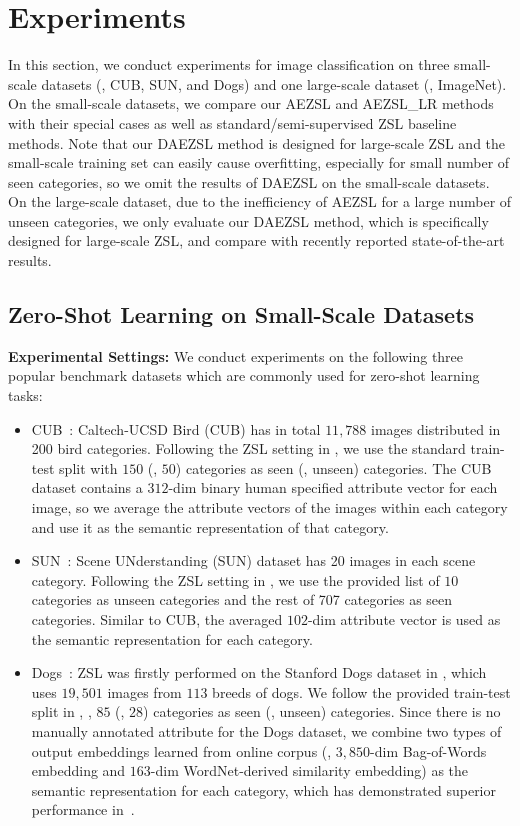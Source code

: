 \documentclass[journal]{IEEEtran}
\begin{document}
\section{Experiments} \label{sec:exp}
In this section, we conduct experiments for image classification on three small-scale datasets (\eg, CUB, SUN, and Dogs) and one large-scale dataset (\eg, ImageNet). On the small-scale datasets, we compare our AEZSL and AEZSL\_LR methods with their special cases as well as standard/semi-supervised ZSL baseline methods. Note that our DAEZSL method is designed for large-scale ZSL and the small-scale training set can easily cause overfitting, especially for small number of seen categories, so we omit the results of DAEZSL on the small-scale datasets.
On the large-scale dataset, due to the inefficiency of AEZSL for a large number of unseen categories, we only evaluate our DAEZSL method, which is specifically designed for large-scale ZSL, and compare with recently reported state-of-the-art results.

\subsection{Zero-Shot Learning on Small-Scale Datasets} \label{sec:exp_standard}

\noindent\textbf{Experimental Settings:} We conduct experiments on the following three popular benchmark datasets which are commonly used for zero-shot learning tasks:
\begin{itemize}
\item CUB~\cite{WahCUB_200_2011}: Caltech-UCSD Bird (CUB) has in total $11,788$ images distributed in 200 bird categories. Following the ZSL setting in \cite{akata2013label}, we use the standard train-test split with $150$ (\resp, $50$) categories as seen (\resp, unseen) categories. The CUB dataset contains a $312$-dim binary human specified attribute vector for each image, so we average the attribute vectors of the images within each category and use it as the semantic representation of that category.
\item SUN~\cite{xiao2010sun}: Scene UNderstanding (SUN) dataset has 20 images in each scene category. Following the ZSL setting in \cite{jayaraman2014zero}, we use the provided list of $10$ categories as unseen categories and the rest of 707 categories as seen categories. Similar to CUB, the averaged $102$-dim attribute vector is used as the semantic representation for each category.
\item Dogs~\cite{KhoslaYaoJayadevaprakashFeiFei_FGVC2011}: ZSL was firstly performed on the Stanford Dogs dataset in \cite{akata2015evaluation}, which uses $19,501$ images from $113$ breeds of dogs. We follow the provided train-test split in \cite{akata2015evaluation}, \ie, $85$ (\resp, $28$) categories as seen (\resp, unseen) categories. Since there is no manually annotated attribute for the Dogs dataset, we combine two types of output embeddings learned from online corpus (\ie, $3,850$-dim Bag-of-Words embedding and $163$-dim WordNet-derived similarity embedding) as the semantic representation for each category, which has demonstrated superior performance in~\cite{akata2015evaluation}. 
\end{itemize}
\end{document}
